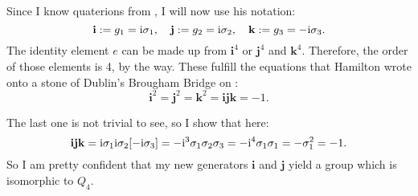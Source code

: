 \documentclass[11pt, english, fleqn, DIV=15, headinclude, BCOR=1cm]{scrartcl}
\begin{document}
\newcommand\qi{\mathbf i}
\newcommand\qj{\mathbf j}
\newcommand\qk{\mathbf k}

Since I know quaterions from \parencite[§11.1]{penrose-road_to_reality}, I will
now use his notation:
\[
    \qi := g_1 = \iup\1
    \eqnsep
    \qj := g_2 = \iup\2
    \eqnsep
    \qk := g_3 = -\iup\3.
\]
The identity element $e$ can be made up from $\qi^4$ or $\qj^4$ and $\qk^4$.
Therefore, the order of those elements is 4, by the way. These fulfill the
equations that Hamilton wrote onto a stone of Dublin's Brougham Bridge on
 \parencite[198]{penrose-road_to_reality}:
\[
    \qi^2 = \qj^2 = \qk^2 = \qi\qj\qk = -1.
\]

The last one is not trivial to see, so I show that here:
\[
    \qi\qj\qk = \iup\1 \iup\2 [-\iup\3] = - \iup^3 \1\2\3 = - \iup^4 \1\1
    = - \1^2 = -1.
\]
So I am pretty confident that my new generators $\qi$ and $\qj$ yield a group
which is isomorphic to $Q_4$.
\end{document}

